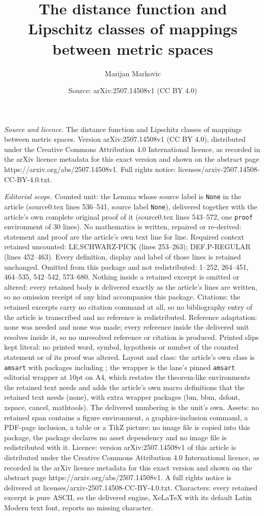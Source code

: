 \documentclass[10pt,a4paper]{amsart}
\title[The distance function and Lipschitz classes of mappings betw]{The distance function and Lipschitz classes of mappings between metric spaces}
\author{Marijan Markovic}
\date{Source: arXiv:2507.14508v1 (CC BY 4.0)}
\begin{document}
\maketitle

\noindent\emph{Source and licence.} The distance function and Lipschitz classes of mappings between metric spaces. Version arXiv:2507.14508v1 (CC BY 4.0), distributed under the Creative Commons Attribution 4.0 International licence, as recorded in the arXiv licence metadata for this exact version and shown on the abstract page https://arxiv.org/abs/2507.14508v1. Full rights notice: licenses/arxiv-2507.14508-CC-BY-4.0.txt.\par\smallskip

\noindent\textit{Editorial scope.} Counted unit: the Lemma whose source label is \texttt{None} in the article (source0.tex lines 536--541, source label \texttt{None}), delivered together with the article's own complete original proof of it (source0.tex lines 543--572, one \texttt{proof} environment of 30 lines). No mathematics is written, repaired or re-derived: statement and proof are the article's own text line for line. Required context retained uncounted: LE.SCHWARZ-PICK (lines 253--263); DEF.P-REGULAR (lines 452--463). Every definition, display and label of those lines is retained unchanged. Omitted from this package and not redistributed: 1--252, 264--451, 464--535, 542--542, 573--680. Nothing inside a retained excerpt is omitted or altered: every retained body is delivered exactly as the article's lines are written, so no omission receipt of any kind accompanies this package. Citations: the retained excerpts carry no citation command at all, so no bibliography entry of the article is transcribed and no reference is redistributed. Reference adaptation: none was needed and none was made; every reference inside the delivered unit resolves inside it, so no unresolved reference or citation is produced. Printed slips kept literal: no printed word, symbol, hypothesis or number of the counted statement or of its proof was altered. Layout and class: the article's own class is \texttt{amsart} with packages including ; the wrapper is the lane's pinned \texttt{amsart} editorial wrapper at 10pt on A4, which restates the theorem-like environments the retained text needs and adds the article's own macro definitions that the retained text needs (none), with extra wrapper packages (bm, bbm, dsfont, xspace, cancel, mathtools). The delivered numbering is the unit's own. Assets: no retained span contains a figure environment, a graphics-inclusion command, a PDF-page inclusion, a table or a TikZ picture; no image file is copied into this package, the package declares no asset dependency and no image file is redistributed with it. Licence: version arXiv:2507.14508v1 of this article is distributed under the Creative Commons Attribution 4.0 International licence, as recorded in the arXiv licence metadata for this exact version and shown on the abstract page https://arxiv.org/abs/2507.14508v1. A full rights notice is delivered at licenses/arxiv-2507.14508-CC-BY-4.0.txt. Characters: every retained excerpt is pure ASCII, so the delivered engine, XeLaTeX with its default Latin Modern text font, reports no missing character.
\end{document}
